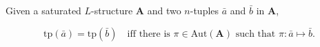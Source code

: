 Given a saturated $L$-structure $\mathbf{A}$ and two $n$-tuples $\bar{a}$ and $\bar{b}$ in $\mathbf{A}$,

$$\text{tp}(\bar{a}) = \text{tp}(\bar{b}) \quad \text{iff there is } \pi \in \text{Aut}(\mathbf{A}) \text{ such that } \pi : \bar{a} \mapsto \bar{b}.$$
